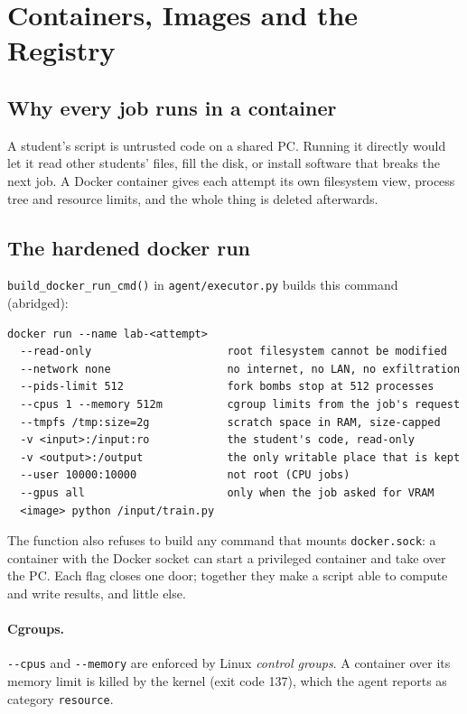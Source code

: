 \section{Containers, Images and the Registry}

\subsection{Why every job runs in a container}

A student's script is untrusted code on a shared PC. Running it directly
would let it read other students' files, fill the disk, or install software
that breaks the next job. A Docker container gives each attempt its own
filesystem view, process tree and resource limits, and the whole thing is
deleted afterwards.

\subsection{The hardened docker run}

\texttt{build\_docker\_run\_cmd()} in \texttt{agent/executor.py} builds this
command (abridged):

\begin{verbatim}
docker run --name lab-<attempt>
  --read-only                     root filesystem cannot be modified
  --network none                  no internet, no LAN, no exfiltration
  --pids-limit 512                fork bombs stop at 512 processes
  --cpus 1 --memory 512m          cgroup limits from the job's request
  --tmpfs /tmp:size=2g            scratch space in RAM, size-capped
  -v <input>:/input:ro            the student's code, read-only
  -v <output>:/output             the only writable place that is kept
  --user 10000:10000              not root (CPU jobs)
  --gpus all                      only when the job asked for VRAM
  <image> python /input/train.py
\end{verbatim}

The function also refuses to build any command that mounts
\texttt{docker.sock}: a container with the Docker socket can start a privileged
container and take over the PC. Each flag closes one door; together they make
a script able to compute and write results, and little else.

\paragraph{Cgroups.} \verb|--cpus| and \verb|--memory| are enforced by
Linux \emph{control groups}. A container over its memory limit is killed by the
kernel (exit code 137), which the agent reports as category \texttt{resource}.

